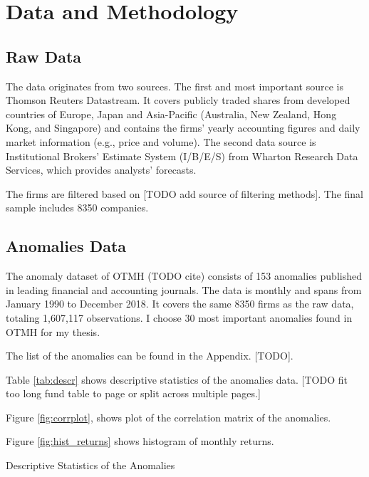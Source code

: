 \chapter{Data and Methodology}
\label{chap:met}

\section{Raw Data}

	The data originates from two sources. The first and most important source is Thomson Reuters Datastream. It covers publicly traded shares from developed countries of Europe, Japan and Asia-Pacific (Australia, New Zealand, Hong Kong, and Singapore) and contains the firms' yearly accounting figures and daily market information (e.g., price and volume).  The second data source is Institutional Brokers’ Estimate System (I/B/E/S) from Wharton Research Data Services, which provides analysts' forecasts. 
	
	The firms are filtered based on [TODO add source of filtering methods].  
	The final sample includes 8350 companies.


\section{Anomalies Data}
	The anomaly dataset of OTMH (TODO cite) consists of 153 anomalies published in leading financial and accounting journals. The data is monthly and spans from January 1990 to December 2018. It covers the same 8350 firms as the raw data, totaling 1,607,117 observations. I choose 30 most important anomalies found in OTMH for my thesis.    
	
	The list of the anomalies can be found in the Appendix. [TODO]. 
	
	Table \ref{tab:descr} shows descriptive statistics of the anomalies data. [TODO fit too long fund table to page or split across multiple pages.]
		
	Figure \ref{fig:corrplot}, shows plot of the correlation matrix of the anomalies.

	Figure \ref{fig:hist_returns} shows histogram of monthly returns. 
	

	
	\begin{table}
		\resizebox{\textwidth}{!}{}
		\caption{Descriptive Statistics of the Anomalies}
		\label{tab:descr}
	\end{table}


